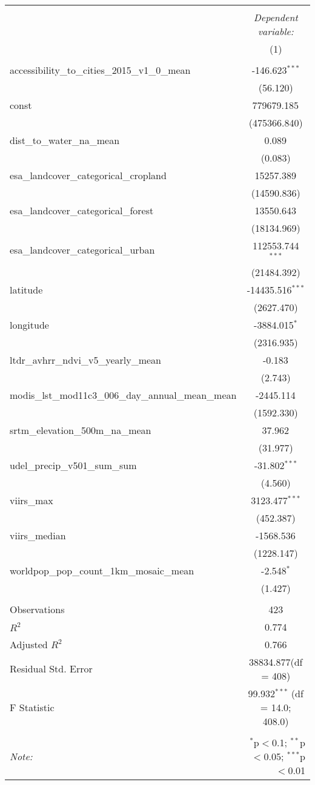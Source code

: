 \begin{table}[!htbp] \centering
\begin{tabular}{@{\extracolsep{5pt}}lc}
\\[-1.8ex]\hline
\hline \\[-1.8ex]
& \multicolumn{1}{c}{\textit{Dependent variable:}} \
\cr \cline{1-2}
\\[-1.8ex] & (1) \\
\hline \\[-1.8ex]
 accessibility_to_cities_2015_v1_0_mean & -146.623$^{***}$ \\
  & (56.120) \\
 const & 779679.185$^{}$ \\
  & (475366.840) \\
 dist_to_water_na_mean & 0.089$^{}$ \\
  & (0.083) \\
 esa_landcover_categorical_cropland & 15257.389$^{}$ \\
  & (14590.836) \\
 esa_landcover_categorical_forest & 13550.643$^{}$ \\
  & (18134.969) \\
 esa_landcover_categorical_urban & 112553.744$^{***}$ \\
  & (21484.392) \\
 latitude & -14435.516$^{***}$ \\
  & (2627.470) \\
 longitude & -3884.015$^{*}$ \\
  & (2316.935) \\
 ltdr_avhrr_ndvi_v5_yearly_mean & -0.183$^{}$ \\
  & (2.743) \\
 modis_lst_mod11c3_006_day_annual_mean_mean & -2445.114$^{}$ \\
  & (1592.330) \\
 srtm_elevation_500m_na_mean & 37.962$^{}$ \\
  & (31.977) \\
 udel_precip_v501_sum_sum & -31.802$^{***}$ \\
  & (4.560) \\
 viirs_max & 3123.477$^{***}$ \\
  & (452.387) \\
 viirs_median & -1568.536$^{}$ \\
  & (1228.147) \\
 worldpop_pop_count_1km_mosaic_mean & -2.548$^{*}$ \\
  & (1.427) \\
\hline \\[-1.8ex]
 Observations & 423 \\
 $R^2$ & 0.774 \\
 Adjusted $R^2$ & 0.766 \\
 Residual Std. Error & 38834.877(df = 408)  \\
 F Statistic & 99.932$^{***}$ (df = 14.0; 408.0) \\
\hline
\hline \\[-1.8ex]
\textit{Note:} & \multicolumn{1}{r}{$^{*}$p$<$0.1; $^{**}$p$<$0.05; $^{***}$p$<$0.01} \\
\end{tabular}
\end{table}